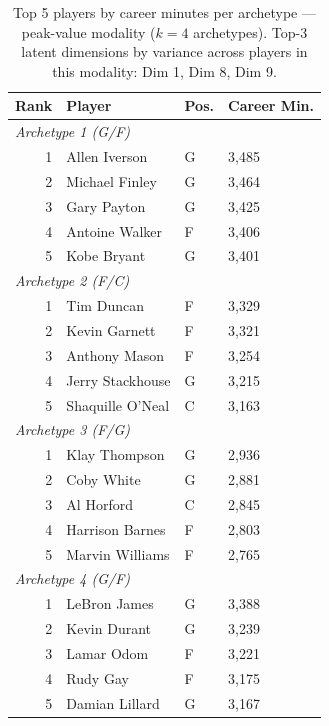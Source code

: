 \begin{table}[htbp]
  \centering\small
  \begin{tabular}{rlll}
    \toprule
    Rank & Player & Pos. & Career Min. \\
    \midrule
    \multicolumn{4}{l}{\textit{Archetype 1 (G/F)}} \\
    \midrule
    1 & Allen Iverson & G & 3,485 \\
    2 & Michael Finley & G & 3,464 \\
    3 & Gary Payton & G & 3,425 \\
    4 & Antoine Walker & F & 3,406 \\
    5 & Kobe Bryant & G & 3,401 \\
    \midrule[0.4pt]
    \multicolumn{4}{l}{\textit{Archetype 2 (F/C)}} \\
    \midrule
    1 & Tim Duncan & F & 3,329 \\
    2 & Kevin Garnett & F & 3,321 \\
    3 & Anthony Mason & F & 3,254 \\
    4 & Jerry Stackhouse & G & 3,215 \\
    5 & Shaquille O'Neal & C & 3,163 \\
    \midrule[0.4pt]
    \multicolumn{4}{l}{\textit{Archetype 3 (F/G)}} \\
    \midrule
    1 & Klay Thompson & G & 2,936 \\
    2 & Coby White & G & 2,881 \\
    3 & Al Horford & C & 2,845 \\
    4 & Harrison Barnes & F & 2,803 \\
    5 & Marvin Williams & F & 2,765 \\
    \midrule[0.4pt]
    \multicolumn{4}{l}{\textit{Archetype 4 (G/F)}} \\
    \midrule
    1 & LeBron James & G & 3,388 \\
    2 & Kevin Durant & G & 3,239 \\
    3 & Lamar Odom & F & 3,221 \\
    4 & Rudy Gay & F & 3,175 \\
    5 & Damian Lillard & G & 3,167 \\
    \bottomrule
  \end{tabular}
  \caption{Top 5 players by career minutes per archetype --- peak-value modality ($k=4$ archetypes). Top-3 latent dimensions by variance across players in this modality: Dim 1, Dim 8, Dim 9.}
  \label{tab:arch_reps_peak_value}
\end{table}

